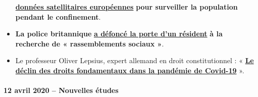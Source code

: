 \begin{itemize}
  \href{https://www.ansa.it/english/news/2020/04/06/coronavirus-italy-activates-satellite-to-monitor-nation-3_f2ffb30c-d550-42f5-82fc-ec1f82c5c625.html}{\textbf{données
  satellitaires européennes}} \textbf{pour surveiller la population
  pendant le confinement}.
\item
  \textbf{La police britannique}
  \href{https://twitter.com/BanTheBBC/status/1249598512427347969}{\textbf{a
  défoncé la porte d'un résident}} \textbf{à la recherche de «
  rassemblements sociaux »}.
\item
  Le professeur Oliver Lepsius, expert allemand en droit constitutionnel
  : «
  \href{https://verfassungsblog.de/vom-niedergang-grundrechtlicher-denkkategorien-in-der-corona-pandemie/}{\textbf{Le
  déclin des droits fondamentaux dans la pandémie de Covid-19}} ».
\end{itemize}

\hypertarget{12-avril-2020--nouvelles-uxe9tudes}{%
\paragraph{12 avril 2020 -- Nouvelles
études}\label{12-avril-2020--nouvelles-uxe9tudes}}


